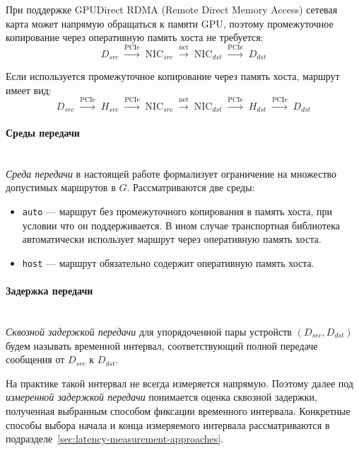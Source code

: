 \documentclass[a4paper,14pt]{extarticle}
\newcommand{\route}[1]{\mathrel{\overset{\text{#1}}{\longrightarrow}}}
\begin{document}
При поддержке GPUDirect RDMA (Remote Direct Memory Access) сетевая карта может напрямую обращаться к памяти GPU, поэтому промежуточное копирование через оперативную память хоста не требуется:
\[
	D_{src} \;\route{PCIe}\; \text{NIC}_{src}
	\;\route{net}\; \text{NIC}_{dst}
	\;\route{PCIe}\; D_{dst}
\]

Если используется промежуточное копирование через память хоста, маршрут имеет вид:
\[
	D_{src} \;\route{PCIe}\; H_{src}
	\;\route{PCIe}\; \text{NIC}_{src}
	\;\route{net}\; \text{NIC}_{dst}
	\;\route{PCIe}\; H_{dst}
	\;\route{PCIe}\; D_{dst}
\]

\paragraph{Среды передачи}\mbox{}\\
\label{par:transport-environments}
\indent \emph{Среда передачи} в настоящей работе формализует ограничение на множество допустимых маршрутов в $G$. Рассматриваются две среды:
\begin{itemize}
	\item \texttt{auto} --- маршрут без промежуточного копирования в память хоста, при условии что он поддерживается. В ином случае транспортная библиотека автоматически использует маршрут через оперативную память хоста.
	\item \texttt{host} --- маршрут обязательно содержит оперативную память хоста.
\end{itemize}

\paragraph{Задержка передачи}\mbox{}\\
\label{par:latency-definition}
\indent \emph{Сквозной задержкой передачи} для упорядоченной пары устройств \((D_{src},D_{dst})\) будем называть временной интервал, соответствующий полной передаче сообщения от \(D_{src}\) к \(D_{dst}\).

\indent На практике такой интервал не всегда измеряется напрямую. Поэтому далее под \emph{измеренной задержкой передачи} понимается оценка сквозной задержки, полученная выбранным способом фиксации временного интервала. Конкретные способы выбора начала и конца измеряемого интервала рассматриваются в подразделе~\ref{sec:latency-measurement-approaches}.
\end{document}
